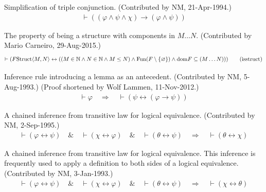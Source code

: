 \begin{lemma} Simplification of triple conjunction. 
(Contributed by NM,
     21-Apr-1994.)
\begin{align}
\vdash ( ( \varphi \wedge \psi \wedge \chi ) \rightarrow ( \varphi \wedge \psi
    ) )\label{eq:3simpa}\tag{3simpa}
\end{align}
\end{lemma}


\begin{lemma} The property of being a structure with
components in $M \ldots N$.
     (Contributed by Mario Carneiro, 29-Aug-2015.)
\begin{align}
\vdash ( F {\rm Struct} \langle M , N \rangle \leftrightarrow ( ( M \in
    \mathbb{N} \wedge N \in \mathbb{N} \wedge M \le N ) \wedge {\rm Fun} ( F
    \setminus \{ \varnothing \} ) \wedge {\rm dom} F \subseteq ( M \ldots N ) )
    )\label{eq:isstruct}\tag{isstruct}
\end{align}
\end{lemma}


\begin{lemma} Inference rule introducing a lemma as an antecedent.  (Contributed by
       NM, 5-Aug-1993.)  (Proof shortened by Wolf Lammen, 11-Nov-2012.)
\begin{align}
\vdash \varphi\quad\Rightarrow\quad \vdash ( \psi \leftrightarrow ( \varphi \rightarrow \psi ) )\label{eq:a1bi}\tag{a1bi}
\end{align}
\end{lemma}


\begin{lemma} A chained inference from transitive law for logical equivalence.
       (Contributed by NM, 2-Sep-1995.)
\begin{align}
\vdash ( \varphi \leftrightarrow \psi )\quad\&\quad \vdash ( \chi \leftrightarrow \varphi )\quad\&\quad \vdash ( \theta \leftrightarrow \psi )\quad\Rightarrow\quad \vdash ( \theta \leftrightarrow \chi
    )\label{eq:3bitr4ri}\tag{3bitr4ri}
\end{align}
\end{lemma}


\begin{lemma} A chained inference from transitive law for logical equivalence.  This
       inference is frequently used to apply a definition to both sides of a
       logical equivalence.  (Contributed by NM, 3-Jan-1993.)
\begin{align}
\vdash ( \varphi \leftrightarrow \psi )\quad\&\quad \vdash ( \chi \leftrightarrow \varphi )\quad\&\quad \vdash ( \theta \leftrightarrow \psi )\quad\Rightarrow\quad \vdash ( \chi \leftrightarrow \theta
    )\label{eq:3bitr4i}\tag{3bitr4i}
\end{align}
\end{lemma}



